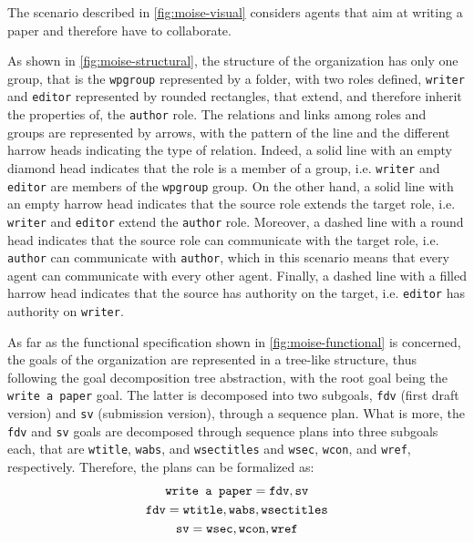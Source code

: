 The scenario described in \cref{fig:moise-visual} considers agents that aim at writing a paper and therefore have to collaborate.

As shown in \cref{fig:moise-structural}, the structure of the organization has only one group, that is the \texttt{wpgroup} represented by a folder, with two roles defined, \texttt{writer} and \texttt{editor} represented by rounded rectangles, that extend, and therefore inherit the properties of, the \texttt{author} role.
The relations and links among roles and groups are represented by arrows, with the pattern of the line and the different harrow heads indicating the type of relation.
Indeed, a solid line with an empty diamond head indicates that the role is a member of a group, i.e. \texttt{writer} and \texttt{editor} are members of the \texttt{wpgroup} group.
On the other hand, a solid line with an empty harrow head indicates that the source role extends the target role, i.e. \texttt{writer} and \texttt{editor} extend the \texttt{author} role.
Moreover, a dashed line with a round head indicates that the source role can communicate with the target role, i.e. \texttt{author} can communicate with \texttt{author}, which in this scenario means that every agent can communicate with every other agent.
Finally, a dashed line with a filled harrow head indicates that the source has authority on the target, i.e. \texttt{editor} has authority on \texttt{writer}.

As far as the functional specification shown in \cref{fig:moise-functional} is concerned, the goals of the organization are represented in a tree-like structure, thus following the goal decomposition tree abstraction, with the root goal being the \texttt{write a paper} goal.
The latter is decomposed into two subgoals, \texttt{fdv} (first draft version) and \texttt{sv} (submission version), through a sequence plan.
What is more, the \texttt{fdv} and \texttt{sv} goals are decomposed through sequence plans into three subgoals each, that are \texttt{wtitle}, \texttt{wabs}, and \texttt{wsectitles} and \texttt{wsec}, \texttt{wcon}, and \texttt{wref}, respectively.
Therefore, the plans can be formalized as:
\begin{gather}
    \text{\texttt{write a paper}} = \text{\texttt{fdv}}, \text{\texttt{sv}} \nonumber\\
    \text{\texttt{fdv}} = \text{\texttt{wtitle}}, \text{\texttt{wabs}}, \text{\texttt{wsectitles}} \nonumber\\
    \text{\texttt{sv}} = \text{\texttt{wsec}}, \text{\texttt{wcon}}, \text{\texttt{wref}} \nonumber
\end{gather}

